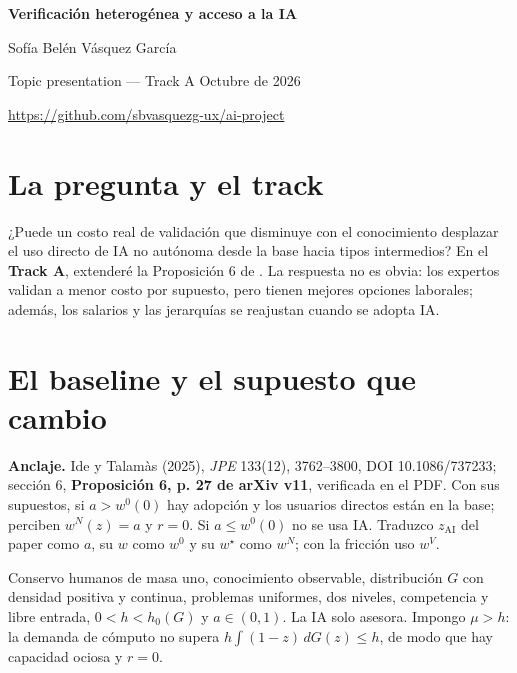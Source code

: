 \documentclass[11pt]{article}
\begin{document}
\begin{center}
{\Large\bfseries Verificación heterogénea y acceso a la IA}\par
Sofía Belén Vásquez García\par
\small Topic presentation --- Track A \quad Octubre de 2026\par
\url{https://github.com/sbvasquezg-ux/ai-project}
\end{center}
\section{La pregunta y el track}
¿Puede un costo real de validación que disminuye con el conocimiento desplazar el uso directo de IA no autónoma desde la base hacia tipos intermedios? En el \textbf{Track A}, extenderé la Proposición 6 de \citet{ide2025}. La respuesta no es obvia: los expertos validan a menor costo por supuesto, pero tienen mejores opciones laborales; además, los salarios y las jerarquías se reajustan cuando se adopta IA.
\section{El baseline y el supuesto que cambio}
\textbf{Anclaje.} Ide y Talamàs (2025), \emph{JPE} 133(12), 3762--3800, DOI 10.1086/737233; sección 6, \textbf{Proposición 6, p. 27 de arXiv v11}, verificada en el PDF. Con sus supuestos, si $a>w^0(0)$ hay adopción y los usuarios directos están en la base; perciben $w^N(z)=a$ y $r=0$. Si $a\leq w^0(0)$ no se usa IA. Traduzco $z_{\mathrm{AI}}$ del paper como $a$, su $w$ como $w^0$ y su $w^\star$ como $w^N$; con la fricción uso $w^V$.

Conservo humanos de masa uno, conocimiento observable, distribución $G$ con densidad positiva y continua, problemas uniformes, dos niveles, competencia y libre entrada, $0<h<h_0(G)$ y $a\in(0,1)$. La IA solo asesora. Impongo $\mu>h$: la demanda de cómputo no supera $h\int(1-z)\,dG(z)\leq h$, de modo que hay capacidad ociosa y $r=0$.
\end{document}
